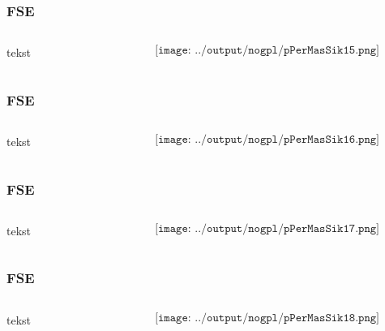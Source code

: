 \documentclass[aspectratio=169,xcolor=dvipsnames]{beamer}
\begin{document}
\begin{frame}
	\frametitle{FSE}
	\begin{columns}
		\begin{column}{0.5\textwidth}
tekst
			
		\end{column}

		\begin{column}{0.5\textwidth}
	$$\texttt{[image: ../output/nogpl/pPerMasSik15.png]}$$
		\end{column}
	\end{columns}
\end{frame}

\begin{frame}
	\frametitle{FSE}
	\begin{columns}
		\begin{column}{0.5\textwidth}
tekst
			
		\end{column}

		\begin{column}{0.5\textwidth}
	$$\texttt{[image: ../output/nogpl/pPerMasSik16.png]}$$
		\end{column}
	\end{columns}
\end{frame}

\begin{frame}
	\frametitle{FSE}
	\begin{columns}
		\begin{column}{0.5\textwidth}
tekst
			
		\end{column}

		\begin{column}{0.5\textwidth}
	$$\texttt{[image: ../output/nogpl/pPerMasSik17.png]}$$
		\end{column}
	\end{columns}
\end{frame}

\begin{frame}
	\frametitle{FSE}
	\begin{columns}
		\begin{column}{0.5\textwidth}
tekst
			
		\end{column}

		\begin{column}{0.5\textwidth}
	$$\texttt{[image: ../output/nogpl/pPerMasSik18.png]}$$
		\end{column}
	\end{columns}
\end{frame}
\end{document}
